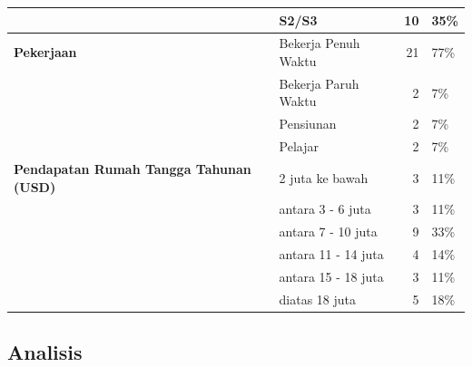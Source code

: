 \documentclass[lettersize,journal]{IEEEtran}
\begin{document}
\begin{table}[h!]
\begin{tabular}{@{}llrl@{}}
                                                   & S2/S3                & 10         & 35\%        \\ \midrule
    \textbf{Pekerjaan}                             & Bekerja Penuh Waktu  & 21         & 77\%        \\
                                                   & Bekerja Paruh Waktu  & 2          & 7\%         \\
                                                   & Pensiunan            & 2          & 7\%         \\
                                                   & Pelajar              & 2          & 7\%         \\ \midrule
    \textbf{Pendapatan Rumah Tangga Tahunan (USD)} & 2 juta ke bawah      & 3          & 11\%        \\
                                                   & antara 3 - 6 juta    & 3          & 11\%        \\
                                                   & antara 7 - 10 juta   & 9          & 33\%        \\
                                                   & antara 11 - 14 juta  & 4          & 14\%        \\
                                                   & antara 15 - 18 juta  & 3          & 11\%        \\
                                                   & diatas 18 juta       & 5          & 18\%        \\ \bottomrule
  \end{tabular}
\end{table}

\subsection{Analisis}
\end{document}
